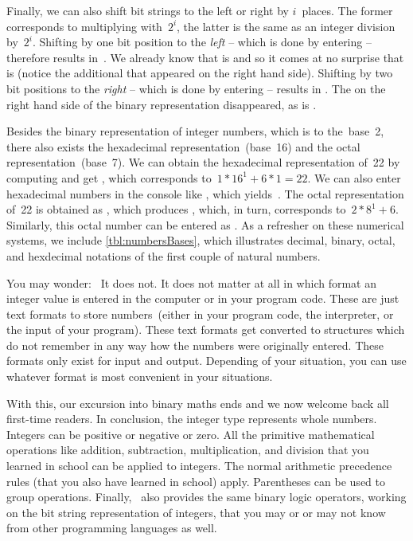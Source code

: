 Finally, we can also shift bit strings to the left or right by $i$~places.
The former corresponds to multiplying with~$2^i$, the latter is the same as an integer division by~$2^i$.
Shifting  by one bit position to the \emph{left} -- which is done by entering \pythonIdx{<\strut<} -- therefore results in~.
We already know that  is  and so it comes at no surprise that  is  (notice the additional  that appeared on the right hand side).
Shifting  by two bit positions to the \emph{right} -- which is done by entering \pythonIdx{>\strut>} -- results in .
The  on the right hand side of the binary representation disappeared, as  is .


Besides the binary representation of integer numbers, which is to the~base~2, there also exists the hexadecimal representation~(base~16) and the octal representation~(base~7).
We can obtain the hexadecimal representation of~22 by computing  and get , which corresponds to~$1*16^1+6*1=22$.
We can also enter hexadecimal numbers in the console like , which yields~.
The octal representation of~22 is obtained as , which produces , which, in turn, corresponds to~$2*8^1+6$.
Similarly, this octal number can be entered as .
As a refresher on these numerical systems, we include \cref{tbl:numbersBases}, which illustrates decimal, binary, octal, and hexdecimal notations of the first couple of natural numbers.

You may wonder:~
It does not.
It does not matter at all in which format an integer value is entered in the computer or in your program code.
These are just text formats to store numbers~(either in your program code, the interpreter, or the input of your program).
These text formats get converted to  structures which do not remember in any way how the numbers were originally entered.
These formats only exist for input and output.
Depending of your situation, you can use whatever format is most convenient in your situations.

With this, our excursion into binary maths ends and we now welcome back all first-time readers.%
%
\endhsection%
%
%
In conclusion, the integer type  represents whole numbers.
Integers can be positive or negative or zero.
All the primitive mathematical operations like addition, subtraction, multiplication, and division that you learned in school can be applied to integers.
The normal arithmetic precedence rules (that you also have learned in school) apply.
Parentheses can be used to group operations.
Finally, \python\ also provides the same binary logic operators, working on the bit string representation of integers, that you may or or may not know from other programming languages as well.
\endhsection%
\FloatBarrier%
\endhsection%
%
